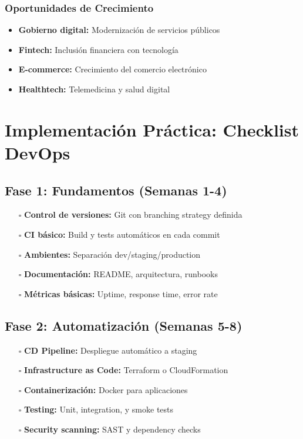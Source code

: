\documentclass[12pt,a4paper]{article}
\begin{document}
\subsubsection{Oportunidades de Crecimiento}
\begin{itemize}
    \item \textbf{Gobierno digital:} Modernización de servicios públicos
    \item \textbf{Fintech:} Inclusión financiera con tecnología
    \item \textbf{E-commerce:} Crecimiento del comercio electrónico
    \item \textbf{Healthtech:} Telemedicina y salud digital
\end{itemize}

\section{Implementación Práctica: Checklist DevOps}

\subsection{Fase 1: Fundamentos (Semanas 1-4)}
\begin{itemize}
    \item[$\square$] \textbf{Control de versiones:} Git con branching strategy definida
    \item[$\square$] \textbf{CI básico:} Build y tests automáticos en cada commit
    \item[$\square$] \textbf{Ambientes:} Separación dev/staging/production
    \item[$\square$] \textbf{Documentación:} README, arquitectura, runbooks
    \item[$\square$] \textbf{Métricas básicas:} Uptime, response time, error rate
\end{itemize}

\subsection{Fase 2: Automatización (Semanas 5-8)}
\begin{itemize}
    \item[$\square$] \textbf{CD Pipeline:} Despliegue automático a staging
    \item[$\square$] \textbf{Infrastructure as Code:} Terraform o CloudFormation
    \item[$\square$] \textbf{Containerización:} Docker para aplicaciones
    \item[$\square$] \textbf{Testing:} Unit, integration, y smoke tests
    \item[$\square$] \textbf{Security scanning:} SAST y dependency checks
\end{itemize}
\end{document}
